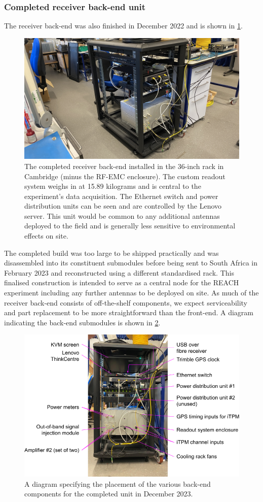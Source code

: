\subsubsection{Completed receiver back-end unit}
The receiver back-end was also finished in December 2022 and is shown in \cref{fig:backend_complete}.
\begin{figure}
    \centering
    \includegraphics[width=.7\textwidth]{backend_complete}
    \caption{The completed receiver back-end installed in the 36-inch rack in Cambridge (minus the RF-EMC enclosure). The custom readout system weighs in at 15.89 kilograms and is central to the experiment's data acquisition. The Ethernet switch and power distribution units can be seen and are controlled by the Lenovo server. This unit would be common to any additional antennas deployed to the field and is generally less sensitive to environmental effects on site.}
    \label{fig:backend_complete}
\end{figure}
The completed build was too large to be shipped practically and was disassembled into its constituent submodules before being sent to South Africa in February 2023 and reconstructed using a different standardised rack. This finalised construction is intended to serve as a central node for the REACH experiment including any further antennas to be deployed on site. As much of the receiver back-end consists of off-the-shelf components, we expect serviceability and part replacement to be more straightforward than the front-end. A diagram indicating the back-end submodules is shown in \cref{fig:backend_diag}.
\begin{figure}
    \centering
    \includegraphics[width=\textwidth]{backend_components}
    \caption{A diagram specifying the placement of the various back-end components for the completed unit in December 2023.}
    \label{fig:backend_diag}
\end{figure}



